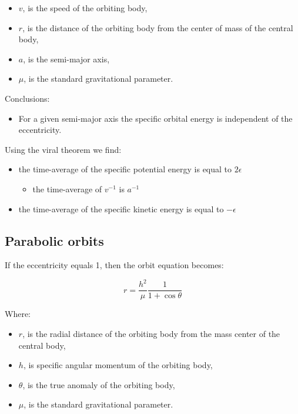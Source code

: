 \documentclass[12pt]{article}
\begin{document}
\begin{itemize}
  \item \(v\), is the speed of the orbiting body,
  \item \(r\), is the distance of the orbiting body from the center of mass of the central body,
  \item \(a\), is the semi-major axis,
  \item \(\mu\), is the standard gravitational parameter.
\end{itemize}

Conclusions:

\begin{itemize}
  \item For a given semi-major axis the specific orbital energy is independent of the eccentricity.
\end{itemize}

Using the viral theorem we find:

\begin{itemize}
  \item the time-average of the specific potential energy is equal to \(2\epsilon\)
    \begin{itemize}
      \item the time-average of \(v^{-1}\) is \(a^{-1}\)
    \end{itemize}
  \item the time-average of the specific kinetic energy is equal to \(-\epsilon\)
\end{itemize}

\subsection{Parabolic orbits}

If the eccentricity equals 1, then the orbit equation becomes:

\[r=\frac{h^2}{\mu}\frac{1}{1+\cos\theta}\]

Where:

\begin{itemize}
  \item \(r\), is the radial distance of the orbiting body from the mass center of the central body,
  \item \(h\), is specific angular momentum of the orbiting body,
  \item \(\theta\), is the true anomaly of the orbiting body,
  \item \(\mu\), is the standard gravitational parameter.
\end{itemize}
\end{document}

